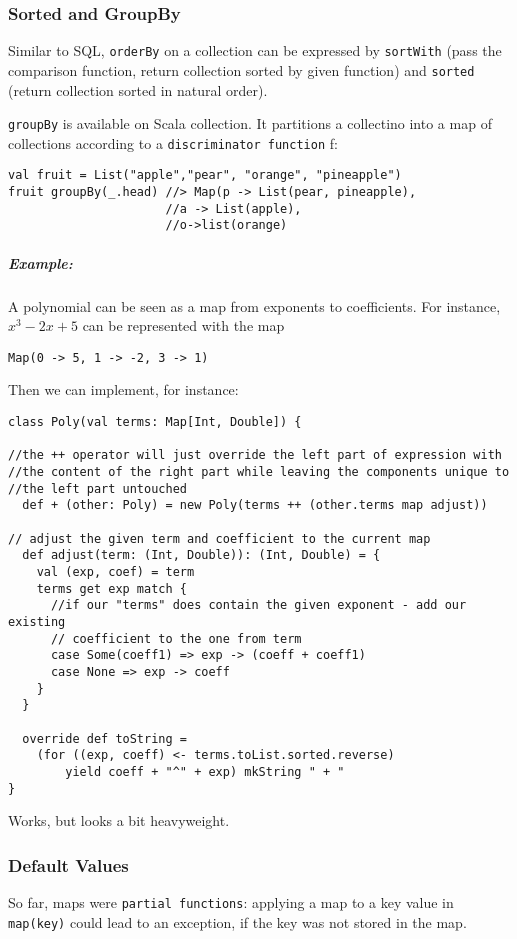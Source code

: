 \documentclass{scrartcl}
\newcommand{\example}{\subparagraph{Example:}} %
\newcommand{\term}[1]{\verb~#1~} %
\begin{document}
\subsubsection{Sorted and GroupBy}
\label{sec:SortedAndGroupby}
Similar to SQL, \lstinline|orderBy| on a collection can be expressed by
\lstinline|sortWith| (pass the comparison function, return collection sorted by
given function) and \lstinline|sorted| (return collection sorted in natural
order).

\lstinline|groupBy| is available on Scala collection. It partitions a collectino
into a map of collections according to a \term{discriminator function} f:
\begin{lstlisting}
val fruit = List("apple","pear", "orange", "pineapple")
fruit groupBy(_.head) //> Map(p -> List(pear, pineapple),
                      //a -> List(apple),
                      //o->list(orange)
\end{lstlisting}

\example A polynomial can be seen as a map from exponents to coefficients. For
instance, $x^3 - 2x + 5$ can be represented with the map
\begin{lstlisting}
Map(0 -> 5, 1 -> -2, 3 -> 1)
\end{lstlisting}
Then we can implement, for instance:
\begin{lstlisting}
class Poly(val terms: Map[Int, Double]) {

//the ++ operator will just override the left part of expression with
//the content of the right part while leaving the components unique to
//the left part untouched
  def + (other: Poly) = new Poly(terms ++ (other.terms map adjust))

// adjust the given term and coefficient to the current map
  def adjust(term: (Int, Double)): (Int, Double) = {
    val (exp, coef) = term
    terms get exp match {
      //if our "terms" does contain the given exponent - add our existing
      // coefficient to the one from term
      case Some(coeff1) => exp -> (coeff + coeff1)
      case None => exp -> coeff
    }
  }

  override def toString =
    (for ((exp, coeff) <- terms.toList.sorted.reverse)
        yield coeff + "^" + exp) mkString " + "
}
\end{lstlisting}
Works, but looks a bit heavyweight.

\subsubsection{Default Values}
\label{sec:DefaultValues}
So far, maps were \term{partial functions}: applying a map to a key value in
\lstinline|map(key)| could lead to an exception, if the key was not stored in the
map.
\end{document}
